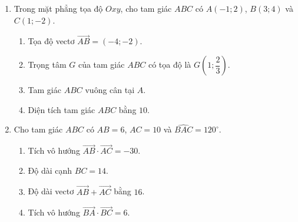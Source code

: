 \documentclass[10pt,a4paper]{article}
\begin{document}
\begin{enumerate}
\item Trong mặt phẳng tọa độ $Oxy$, cho tam giác $ABC$ có $A(-1; 2)$, $B(3; 4)$ và $C(1; -2)$.
\begin{enumerate}
    \item Tọa độ vectơ $\vec{AB} = (-4; -2)$.
    \item Trọng tâm $G$ của tam giác $ABC$ có tọa độ là $G\!\left(1; \dfrac{2}{3}\right)$.
    \item Tam giác $ABC$ vuông cân tại $A$.
    \item Diện tích tam giác $ABC$ bằng $10$.
\end{enumerate}

\item Cho tam giác $ABC$ có $AB = 6$, $AC = 10$ và $\widehat{BAC} = 120^\circ$.
\begin{enumerate}
    \item Tích vô hướng $\vec{AB} \cdot \vec{AC} = -30$.
    \item Độ dài cạnh $BC = 14$.
    \item Độ dài vectơ $\vec{AB} + \vec{AC}$ bằng $16$.
    \item Tích vô hướng $\vec{BA} \cdot \vec{BC} = 6$.
\end{enumerate}
\end{enumerate}
\pagebreak
\end{document}
